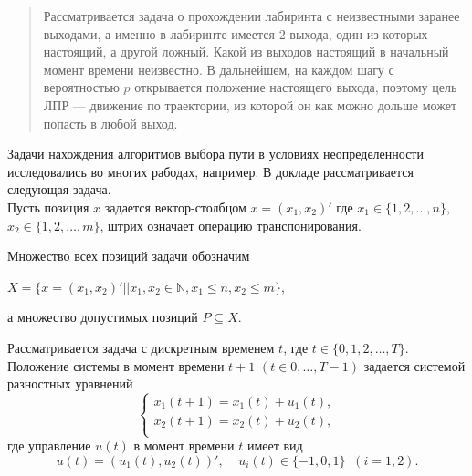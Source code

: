 
\maketitle

\begin{abstract}
Рассматривается задача о прохождении лабиринта с неизвестными заранее выходами, а именно в лабиринте имеется $2$ выхода, один из которых настоящий, а другой ложный. Какой из выходов настоящий в начальный момент времени неизвестно. В дальнейшем, на каждом шагу с вероятностью $p$ открывается положение настоящего выхода, поэтому цель ЛПР ---  движение по траектории, из которой он как можно дольше может попасть в любой выход.

\end{abstract}


Задачи нахождения алгоритмов выбора пути в условиях неопределенности исследовались во многих рабодах, например\cite{bar1,bar2}. В докладе рассматривается следующая задача.\\

Пусть позиция $x$ задается вектор-столбцом $x=(x_1,x_2)'$ где $x_1\in \{1,2,\ldots,n\},$ $x_2\in \{1,2,\ldots,m\}$, штрих означает операцию  транспонирования.

Множество всех позиций задачи обозначим
\begin{center}
 $X=\{x=(x_1,x_2)' || x_1, x_2\in \mathbb{N}, x_1\leq n, x_2\leq m\}$,
\end{center}
а множество допустимых позиций $P \subseteq X$.

Рассматривается задача с дискретным временем $t$, где $t\in\{0,1,2,\ldots,T\}$.
Положение системы в момент времени $t+1$  $(t \in 0, \ldots,T-1)$ задается системой разностных уравнений
\begin{equation} \label{eq1}
		\begin{cases}%
			x_1(t+1)=x_1(t)+u_1(t),\\
			x_2(t+1)=x_2(t)+u_2(t),\\
		\end{cases}
\end{equation}
где управление $u(t)$ в момент времени $t$ имеет вид
\begin{equation} \label{eq2}
u(t)= (u_1(t),u_2(t))', \;\;\;\; u_i(t) \in \{-1,0, 1\} \;\; (i=1,2).
\end{equation}

